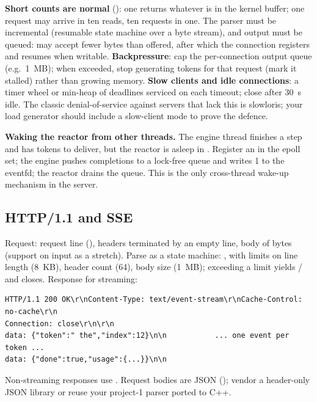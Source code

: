 \textbf{Short counts are normal} (): one  returns whatever is in the kernel buffer; one request may arrive in ten reads, ten requests in one. The parser must be incremental (resumable state machine over a byte stream), and output must be queued:  may accept fewer bytes than offered, after which the connection registers  and resumes when writable. \textbf{Backpressure}: cap the per-connection output queue (e.g.\ 1~MB); when exceeded, stop generating tokens for that request (mark it stalled) rather than growing memory. \textbf{Slow clients and idle connections}: a timer wheel or min-heap of deadlines serviced on each  timeout; close after 30~s idle. The classic denial-of-service against servers that lack this is slowloris; your load generator should include a slow-client mode to prove the defence.

\textbf{Waking the reactor from other threads.} The engine thread finishes a step and has tokens to deliver, but the reactor is asleep in . Register an  in the epoll set; the engine pushes completions to a lock-free queue and writes 1 to the eventfd; the reactor drains the queue. This is the only cross-thread wake-up mechanism in the server.

\subsection{HTTP/1.1 and SSE}

Request: request line (), headers terminated by an empty line, body of  bytes (support  on input as a stretch). Parse as a state machine: , with limits on line length (8~KB), header count (64), body size (1~MB); exceeding a limit yields / and closes. Response for streaming:
\begin{lstlisting}[style=plain]
HTTP/1.1 200 OK\r\nContent-Type: text/event-stream\r\nCache-Control: no-cache\r\n
Connection: close\r\n\r\n
data: {"token":" the","index":12}\n\n           ... one event per token ...
data: {"done":true,"usage":{...}}\n\n
\end{lstlisting}
Non-streaming responses use . Request bodies are JSON (); vendor a header-only JSON library or reuse your project-1 parser ported to C++.

